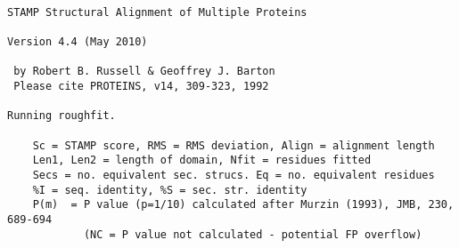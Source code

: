 \begin{scriptsize}\begin{verbatim}

STAMP Structural Alignment of Multiple Proteins

Version 4.4 (May 2010)

 by Robert B. Russell & Geoffrey J. Barton 
 Please cite PROTEINS, v14, 309-323, 1992

Running roughfit.

    Sc = STAMP score, RMS = RMS deviation, Align = alignment length
    Len1, Len2 = length of domain, Nfit = residues fitted
    Secs = no. equivalent sec. strucs. Eq = no. equivalent residues
    %I = seq. identity, %S = sec. str. identity
    P(m)  = P value (p=1/10) calculated after Murzin (1993), JMB, 230, 689-694
            (NC = P value not calculated - potential FP overflow)


\end{verbatim}
\end{scriptsize}
